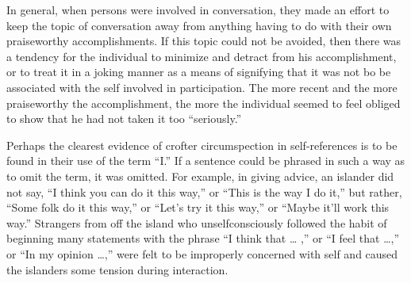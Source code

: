 \documentclass[openany,nobib]{tufte-book}
\begin{document}
In general, when persons were involved in conversation, they made an
effort to keep the topic of conversation away from anything having to do
with their own praiseworthy accomplishments. If this topic could not be
avoided, then there was a tendency for the individual to minimize and
detract from his accomplishment, or to treat it in a joking manner as a
means of signifying that it was not bo be associated with the self
involved in participation. The more recent and the more praiseworthy the
accomplishment, the more the individual seemed to feel obliged to show
that he had not taken it too ``seriously.''

Perhaps the clearest evidence of crofter circumspection in
self-references is to be found in their use of the term ``I.'' If a
sentence could be phrased in such a way as to omit the term, it was
omitted. For example, in giving advice, an islander did not say, ``I
think you can do it this way,'' or ``This is the way I do it,'' but
rather, ``Some folk do it this way,'' or ``Let's try it this way,'' or
``Maybe it'll work this way.'' Strangers from off the island who
unselfconsciously followed the habit of beginning many statements with
the phrase ``I think that \ldots{} ,'' or ``I feel that \ldots,'' or
``In my opinion \ldots,'' were felt to be improperly concerned with self
and caused the islanders some tension during interaction.

\enlargethispage{\baselineskip}
\end{document}
